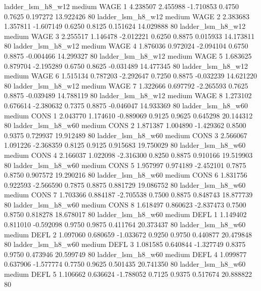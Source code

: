      ladder_lsm_h8_w12     medium     WAGE                 1  4.238507 2.455988 -1.710853 0.4750 0.7625  0.197272   13.922426 80
     ladder_lsm_h8_w12     medium     WAGE                 2  2.383683 1.357811 -1.607149 0.6250 0.8125  0.151624   14.029888 80
     ladder_lsm_h8_w12     medium     WAGE                 3  2.255517 1.146478 -2.012221 0.6250 0.8875  0.015933   14.173811 80
     ladder_lsm_h8_w12     medium     WAGE                 4  1.876036 0.972024 -2.094104 0.6750 0.8875 -0.004466   14.299327 80
     ladder_lsm_h8_w12     medium     WAGE                 5  1.683625 0.879704 -2.195289 0.6750 0.8625 -0.031489   14.477345 80
     ladder_lsm_h8_w12     medium     WAGE                 6  1.515134 0.787203 -2.292647 0.7250 0.8875 -0.032239   14.621220 80
     ladder_lsm_h8_w12     medium     WAGE                 7  1.322666 0.697792 -2.265593 0.7625 0.8875 -0.039489   14.788119 80
     ladder_lsm_h8_w12     medium     WAGE                 8  1.273102 0.676614 -2.380632 0.7375 0.8875 -0.046047   14.933369 80
     ladder_lsm_h8_w60     medium     CONS                 1  2.043770 1.174610 -0.889069 0.9125 0.9625  0.645298   20.144312 80
     ladder_lsm_h8_w60     medium     CONS                 2  1.871387 1.004890 -1.429362 0.8500 0.9375  0.729937   19.912489 80
     ladder_lsm_h8_w60     medium     CONS                 3  2.566067 1.091226 -2.368359 0.8125 0.9125  0.915683   19.750029 80
     ladder_lsm_h8_w60     medium     CONS                 4  2.166037 1.022098 -2.316300 0.8250 0.8875  0.910166   19.519903 80
     ladder_lsm_h8_w60     medium     CONS                 5  1.957997 0.974189 -2.452101 0.7875 0.8750  0.907572   19.290216 80
     ladder_lsm_h8_w60     medium     CONS                 6  1.831756 0.922593 -2.566590 0.7875 0.8875  0.881729   19.086752 80
     ladder_lsm_h8_w60     medium     CONS                 7  1.703366 0.884187 -2.705538 0.7500 0.8875  0.848743   18.877739 80
     ladder_lsm_h8_w60     medium     CONS                 8  1.618497 0.860623 -2.837473 0.7500 0.8750  0.818278   18.678017 80
     ladder_lsm_h8_w60     medium     DEFL                 1  1.149402 0.811010 -0.592098 0.9750 0.9875  0.411764   20.373437 80
     ladder_lsm_h8_w60     medium     DEFL                 2  1.097060 0.680659 -1.033672 0.9250 0.9750  0.440877   20.479848 80
     ladder_lsm_h8_w60     medium     DEFL                 3  1.081585 0.640844 -1.327749 0.8375 0.9750  0.473946   20.599749 80
     ladder_lsm_h8_w60     medium     DEFL                 4  1.099877 0.637906 -1.577774 0.7750 0.9625  0.501435   20.741350 80
     ladder_lsm_h8_w60     medium     DEFL                 5  1.106662 0.636624 -1.788052 0.7125 0.9375  0.517674   20.888822 80
